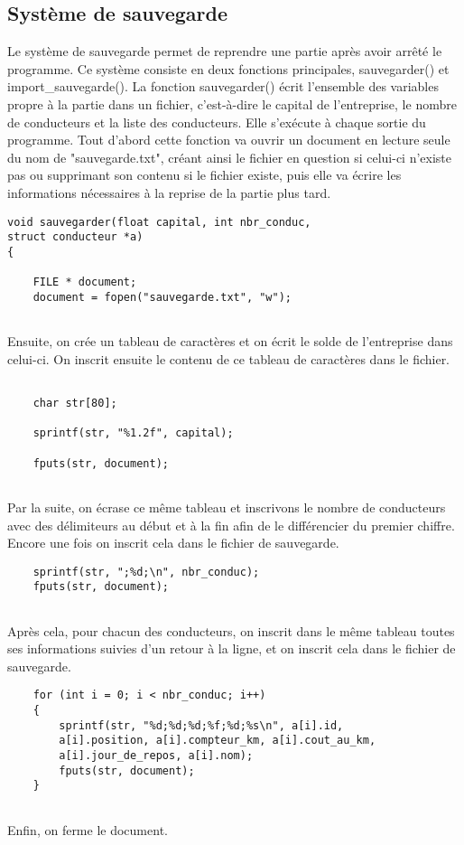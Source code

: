\documentclass[a4paper, 12pt]{article}
\begin{document}
    \subsection{Système de sauvegarde}
        Le système de sauvegarde permet de reprendre une partie après avoir arrêté le programme. Ce système consiste en deux fonctions principales, sauvegarder() et import\_sauvegarde().
        La fonction sauvegarder() écrit l'ensemble des variables propre à la partie dans un fichier, c'est-à-dire le capital de l'entreprise, le nombre de conducteurs et la liste des conducteurs. Elle s'exécute à chaque sortie du programme.
        Tout d'abord cette fonction va ouvrir un document en lecture seule du nom de "sauvegarde.txt", créant ainsi le fichier en question si celui-ci n'existe pas ou supprimant son contenu si le fichier existe, puis elle va écrire les informations nécessaires à la reprise de la partie plus tard.

\begin{lstlisting}
void sauvegarder(float capital, int nbr_conduc, 
struct conducteur *a)
{

    FILE * document;
    document = fopen("sauvegarde.txt", "w");


\end{lstlisting}
    Ensuite, on crée un tableau de caractères et on écrit le solde de l'entreprise dans celui-ci. On inscrit ensuite le contenu de ce tableau de caractères dans le fichier.
\begin{lstlisting}

    char str[80];

    sprintf(str, "%1.2f", capital);

    fputs(str, document);


\end{lstlisting}
    Par la suite, on écrase ce même tableau et inscrivons le nombre de conducteurs avec des délimiteurs au début et à la fin afin de le différencier du premier chiffre.
    Encore une fois on inscrit cela dans le fichier de sauvegarde.
\begin{lstlisting}
    sprintf(str, ";%d;\n", nbr_conduc);
    fputs(str, document);


\end{lstlisting}
    Après cela, pour chacun des conducteurs, on inscrit dans le même tableau toutes ses informations suivies d'un retour à la ligne, et on inscrit cela dans le fichier de sauvegarde.
\begin{lstlisting}
    for (int i = 0; i < nbr_conduc; i++)
    {
        sprintf(str, "%d;%d;%d;%f;%d;%s\n", a[i].id, 
        a[i].position, a[i].compteur_km, a[i].cout_au_km, 
        a[i].jour_de_repos, a[i].nom);
        fputs(str, document);
    }


\end{lstlisting}
Enfin, on ferme le document.
\end{document}
